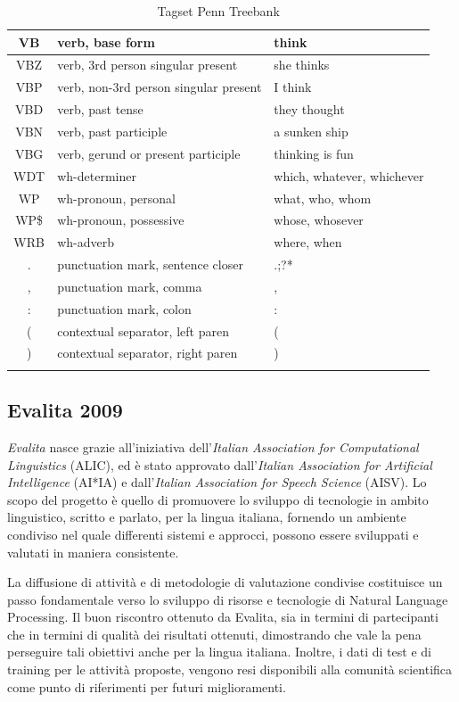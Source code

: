 \begin{longtable}{| c | p{} | p{} |}
  VB & verb, base form & think  \\ \hline
  VBZ & verb, 3rd person singular present & she thinks  \\ \hline
  VBP & verb, non-3rd person singular present & I think  \\ \hline
  VBD & verb, past tense & they thought  \\ \hline
  VBN & verb, past participle & a sunken ship  \\ \hline
  VBG & verb, gerund or present participle & thinking is fun  \\ \hline
  WDT & wh-determiner & which, whatever, whichever  \\ \hline
  WP & wh-pronoun, personal & what, who, whom  \\ \hline
  WP\$ & wh-pronoun, possessive & whose, whosever  \\ \hline
  WRB & wh-adverb & where, when  \\ \hline
  . & punctuation mark, sentence closer & .;?*  \\ \hline
  , & punctuation mark, comma & ,  \\ \hline
  : & punctuation mark, colon & :  \\ \hline
  ( & contextual separator, left paren & (  \\ \hline
  ) & contextual separator, right paren & ) \\ \hline
  \caption{Tagset Penn Treebank} \label{tab:penn-tagset}
\end{longtable}

\subsection{Evalita 2009}
\emph{Evalita} nasce grazie all'iniziativa dell'\emph{Italian Association for
Computational Linguistics} (ALIC), ed \`e stato approvato dall'\emph{Italian
Association for Artificial Intelligence} (AI*IA) e dall'\emph{Italian Association
for Speech Science} (AISV). Lo scopo del progetto \`e quello di promuovere lo sviluppo
di tecnologie in ambito linguistico, scritto e parlato, per la lingua italiana,
fornendo un ambiente condiviso nel quale differenti sistemi e approcci, possono
essere sviluppati e valutati in maniera consistente.

La diffusione di attivit\`a e di metodologie di valutazione condivise costituisce
un passo fondamentale verso lo sviluppo di risorse e tecnologie di Natural Language
Processing. Il buon riscontro ottenuto da Evalita, sia in termini di partecipanti
che in termini di qualit\`a dei risultati ottenuti, dimostrando che vale la pena
perseguire tali obiettivi anche per la lingua italiana. Inoltre, i dati di test
e di training per le attivit\`a proposte, vengono resi disponibili alla comunit\`a
scientifica come punto di riferimenti per futuri miglioramenti.

